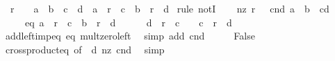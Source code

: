 \begin{isabellebody}
\ \ {\isachardoublequoteopen}r\ {\isasymnoteq}\ {}\ {\isasymLongrightarrow}\ a\ {\isacharequal}{\kern0pt}\ b\ {\isasymand}\ c\ {\isasymnoteq}\ d\ {\isasymLongrightarrow}\ a\ {\isacharplus}{\kern0pt}\ r\ {\isacharasterisk}{\kern0pt}\ c\ {\isasymnoteq}\ b\ {\isacharplus}{\kern0pt}\ r\ {\isacharasterisk}{\kern0pt}\ d{\isachardoublequoteclose}\isanewline
%
\isadelimproof
%
\endisadelimproof
%
\isatagproof
{}\isamarkupfalse%
\ {\isacharparenleft}{\kern0pt}rule\ notI{\isacharparenright}{\kern0pt}\isanewline
\ \ \isamarkupfalse%
\ nz{\isacharcolon}{\kern0pt}\ {\isachardoublequoteopen}r{\isasymnoteq}\ {}{\isachardoublequoteclose}\ \ cnd{\isacharcolon}{\kern0pt}\ {\isachardoublequoteopen}a\ {\isacharequal}{\kern0pt}\ b\ {\isasymand}\ c{\isasymnoteq}d{\isachardoublequoteclose}\isanewline
\ \ \ \ \ eq{\isacharcolon}{\kern0pt}\ {\isachardoublequoteopen}a\ {\isacharplus}{\kern0pt}\ {\isacharparenleft}{\kern0pt}r\ {\isacharasterisk}{\kern0pt}\ c{\isacharparenright}{\kern0pt}\ {\isacharequal}{\kern0pt}\ b\ {\isacharplus}{\kern0pt}\ {\isacharparenleft}{\kern0pt}r\ {\isacharasterisk}{\kern0pt}\ d{\isacharparenright}{\kern0pt}{\isachardoublequoteclose}\isanewline
\ \ \isamarkupfalse%
\ {\isachardoublequoteopen}{\isacharparenleft}{\kern0pt}{}\ {\isacharasterisk}{\kern0pt}\ d{\isacharparenright}{\kern0pt}\ {\isacharplus}{\kern0pt}\ {\isacharparenleft}{\kern0pt}r\ {\isacharasterisk}{\kern0pt}\ c{\isacharparenright}{\kern0pt}\ {\isacharequal}{\kern0pt}\ {\isacharparenleft}{\kern0pt}{}\ {\isacharasterisk}{\kern0pt}\ c{\isacharparenright}{\kern0pt}\ {\isacharplus}{\kern0pt}\ {\isacharparenleft}{\kern0pt}r\ {\isacharasterisk}{\kern0pt}\ d{\isacharparenright}{\kern0pt}{\isachardoublequoteclose}\isanewline
\ \ \ \ \isamarkupfalse%
\ add{\isacharunderscore}{\kern0pt}left{\isacharunderscore}{\kern0pt}imp{\isacharunderscore}{\kern0pt}eq\ eq\ mult{\isacharunderscore}{\kern0pt}zero{\isacharunderscore}{\kern0pt}left\ \isamarkupfalse%
\ {\isacharparenleft}{\kern0pt}simp\ add{\isacharcolon}{\kern0pt}\ cnd{\isacharparenright}{\kern0pt}\isanewline
\ \ \isamarkupfalse%
\ \isamarkupfalse%
\ False\ \isamarkupfalse%
\ crossproduct{\isacharunderscore}{\kern0pt}eq\ {\isacharbrackleft}{\kern0pt}of\ {}\ d{\isacharbrackright}{\kern0pt}\ nz\ cnd\ \isamarkupfalse%
\ simp\isanewline
{}\isamarkupfalse%
%
\endisatagproof
{\isafoldproof}%
%
\isadelimproof

\end{isabellebody}
